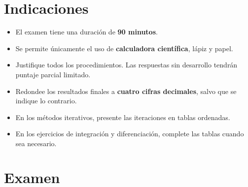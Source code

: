 \documentclass[10pt,respuestas,a4]{aleph-examen}
\begin{document}
\encabezado

\section*{Indicaciones}
\begin{itemize}
    \item El examen tiene una duración de \textbf{90 minutos}.
    \item Se permite únicamente el uso de \textbf{calculadora científica}, lápiz y papel.
    \item Justifique todos los procedimientos. Las respuestas sin desarrollo tendrán puntaje parcial limitado.
    \item Redondee los resultados finales a \textbf{cuatro cifras decimales}, salvo que se indique lo contrario.
    \item En los métodos iterativos, presente las iteraciones en tablas ordenadas.
    \item En los ejercicios de integración y diferenciación, complete las tablas cuando sea necesario.
\end{itemize}

\section*{Examen}
\end{document}
